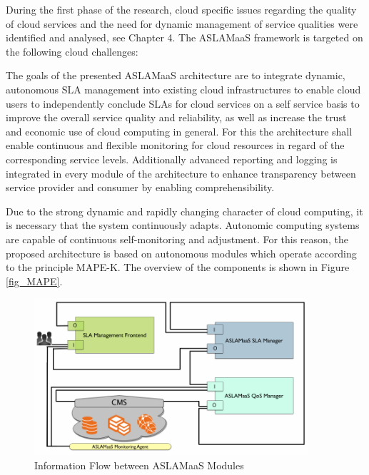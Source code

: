 
During the first phase of the research, cloud specific issues regarding the quality of cloud services and the need for dynamic management of service qualities were identified and analysed, see Chapter 4. The ASLAMaaS framework is targeted on the following cloud challenges:

The goals of the presented ASLAMaaS architecture are to integrate dynamic, autonomous SLA management into existing cloud infrastructures to enable cloud users to independently conclude SLAs for cloud services on a self service basis to improve the overall service quality and reliability, as well as increase the trust and economic use of cloud computing in general. For this the architecture shall enable continuous and flexible monitoring for cloud resources in regard of the corresponding service levels. Additionally advanced reporting and logging is integrated in every module of the architecture to enhance transparency between service provider and consumer by enabling comprehensibility.

Due to the strong dynamic and rapidly changing character of cloud computing, it is necessary that the system continuously adapts. Autonomic computing systems are capable of continuous self-monitoring and adjustment. For this reason, the proposed architecture is based on autonomous modules which operate according to the principle MAPE-K. The overview of the components is shown in Figure \ref{fig_MAPE}.

\begin{figure}[!ht]
\centering
\includegraphics[width=4in]{chapters/chapter4/fig/ASLAMaaS3.PNG}
\caption{Information Flow between ASLAMaaS Modules}
\label{fig_Modules}
\end{figure}


